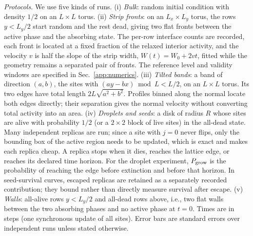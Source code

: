 \textit{Protocols.} We use five kinds of runs.
(i) \emph{Bulk}: random initial condition with density $1/2$ on an $L\times L$ torus.
(ii) \emph{Strip fronts}: on an $L_x\times L_y$ torus, the rows $y<L_y/2$ start random and the
rest dead, giving two flat fronts between the active phase and the absorbing state. The per-row
interface counts are recorded, each front is located at a fixed fraction of
the relaxed interior activity, and the velocity $v$ is half the slope of the
strip width, $W(t) = W_0 + 2vt$,
fitted while the geometry remains a separated pair of fronts. The reference
level and validity windows are specified in Sec.~\ref{app:numerics}.
(iii) \emph{Tilted bands}: a band of direction $(a,b)$, the sites with
$(a y - b x)\bmod L < L/2$, on an $L\times L$ torus. Its two edges have total length
$2L\sqrt{a^2+b^2}$. Profiles binned along the normal locate both edges directly;
their separation gives the normal velocity without converting total activity
into an area.
(iv) \emph{Droplets and seeds}: a disk of radius $R$ whose sites are alive with probability $1/2$
(or a $2\times 2$ block of live sites) in the all-dead state. Many independent replicas are run;
since a site with $j = 0$ never flips, only the bounding box of the active region needs to be
updated, which is exact and makes each replica cheap. A replica stops when it
dies, reaches the lattice edge, or reaches its declared time horizon.
For the droplet experiment, $P_{\rm grow}$ is the probability of reaching
the edge before extinction and before that horizon. In seed-survival curves,
escaped replicas are retained as a separately recorded contribution; they
bound rather than directly measure survival after escape.
(v) \emph{Walls}: all-alive rows $y<L_y/2$ and all-dead rows above, i.e., two flat walls between
the two absorbing phases and no active phase at $t = 0$.
Times are in steps (one synchronous update of all sites). Error bars are standard errors over
independent runs unless stated otherwise.

